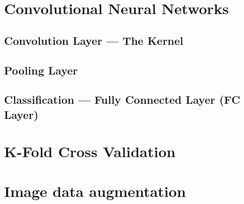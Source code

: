 \section{Convolutional Neural Networks}
\subsection{Convolution Layer — The Kernel}
\subsection{Pooling Layer}
\subsection{Classification — Fully Connected Layer (FC Layer)}
\section{K-Fold Cross Validation}
\section{Image data augmentation}



